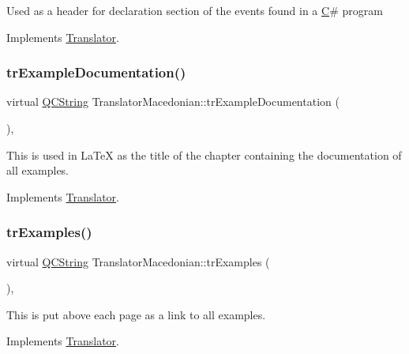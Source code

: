 Used as a header for declaration section of the events found in a \mbox{\hyperlink{class_c}{C}}\# program 

Implements \mbox{\hyperlink{class_translator}{Translator}}.

\mbox{\label{class_translator_macedonian_a768a3a76d4ad5f7048d18e4bbe09f642}} 
\subsubsection{\texorpdfstring{trExampleDocumentation()}{trExampleDocumentation()}}
{\footnotesize\ttfamily virtual \mbox{\hyperlink{class_q_c_string}{Q\+C\+String}} Translator\+Macedonian\+::tr\+Example\+Documentation (\begin{DoxyParamCaption}{ }\end{DoxyParamCaption})\hspace{0.3cm}{\ttfamily [inline]}, {\ttfamily [virtual]}}

This is used in La\+TeX as the title of the chapter containing the documentation of all examples. 

Implements \mbox{\hyperlink{class_translator}{Translator}}.

\mbox{\label{class_translator_macedonian_a71c725d9484ce4777fc08eed63d5c762}} 
\subsubsection{\texorpdfstring{trExamples()}{trExamples()}}
{\footnotesize\ttfamily virtual \mbox{\hyperlink{class_q_c_string}{Q\+C\+String}} Translator\+Macedonian\+::tr\+Examples (\begin{DoxyParamCaption}{ }\end{DoxyParamCaption})\hspace{0.3cm}{\ttfamily [inline]}, {\ttfamily [virtual]}}

This is put above each page as a link to all examples. 

Implements \mbox{\hyperlink{class_translator}{Translator}}.

